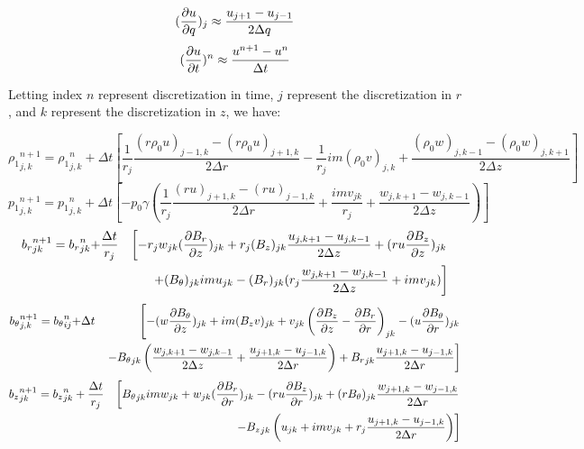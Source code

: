 \documentclass[%
 reprint,
 amsmath,amssymb,
 aps,
]{revtex4-2}
\begin{document}
\begin{equation}
(\pdv{u}{q})_j \approx \frac{u_{j+1} - u_{j-1}}{2 \Delta q}
\end{equation}
\begin{equation}
(\pdv{u}{t}) ^{n} \approx \frac{u^{n+1} - u^n}{\Delta t}
\end{equation}

Letting index $n$ represent discretization in time, $j$ represent the discretization in $r$, and $k$ represent the discretization in $z$, we have:

\begin{equation}
{\rho_1}_{j, k} ^{n+1} = {\rho_1}_{j, k} ^n + \Delta t \left[ \frac{1}{r_j} \frac{(r \rho_0 u)_{j-1, k} - (r \rho_0 u)_{j+1, k}}{2 \Delta r} - \frac{1}{r_j} i m (\rho_0 v) _{j, k} + \frac{(\rho_0 w)_{j, k-1} - (\rho_0 w)_{j, k+1}}{2 \Delta z} \right]
\end{equation}
\begin{equation}
{p_1}_{j, k} ^{n+1} = {p_1}_{j,k} ^n + \Delta t \left[ - p_0 \gamma \left( \frac{1}{r_j} \frac{(r u)_{j+1, k} - (r u)_{j-1, k}}{2 \Delta r} + \frac{i m v_{jk}}{r_j} + \frac{w_{j, k+1} - w_{j, k-1}}{2 \Delta z} \right) \right]
\end{equation}
\begin{eqnarray*}
{b_r}_{jk} ^{n+1} =  {b_r}_{jk} ^n + & \frac{\Delta t}{r_j} & \left[ - r_j w_{jk} ( \pdv{B_r}{z})_{jk} + r_j (B_z)_{jk} \frac{u_{j, k+1} - u_{j, k-1}}{2 \Delta z} + (r u \pdv{B_z}{z})_{jk} \right. \\
& & \left.  + (B_\theta)_{jk} i m u_{jk} - (B_r)_{jk} (r_j \frac{w_{j, k+1} - w_{j, k-1}}{2 \Delta z} + i m v_{jk} ) \right]
\end{eqnarray*}
\begin{eqnarray*}
{b_\theta} _{j, k} ^{n+1} = {b_\theta}_{ij} ^{n} + & \Delta t & \left[  - (w \pdv{B_\theta}{z})_{jk} + i m (B_z v)_{jk} + v_{jk} \left( \pdv{B_z}{z} - \pdv{B_r}{r} \right)_{jk} - (u \pdv{B_\theta}{r})_{jk} \right. \\
& & \left.  - {B_\theta}_{jk} \left( \frac{w_{j, k+1} - w_{j, k-1}}{2 \Delta z} + \frac{u_{j+1, k} - u_{j-1, k}}{2 \Delta r} \right) + {B_r}_{jk} \frac{u_{j+1, k} - u_{j-1, k}}{2 \Delta r} \right]
\end{eqnarray*}
\begin{eqnarray*}
{b_z}_{jk} ^{n+1} = {b_z}_{jk} ^n + \frac{\Delta t}{r_j} & & \left[{B_\theta}_{jk} i m w_{jk} + w_{jk} (\pdv{B_r}{r})_{jk} - (r u \pdv{B_z}{r})_{jk} + (r B_\theta)_{jk} \frac{w_{j+1, k} - w_{j-1, k}}{2 \Delta r} \right. \\
& & \left. - {B_z}_{jk} \left( u_{jk} + i m v_{jk} + r_j \frac{u_{j+1, k} - u_{j-1, k}}{2 \Delta r} \right) \right]
\end{eqnarray*}
\end{document}
